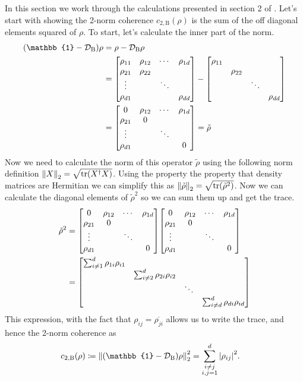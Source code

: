 \documentclass[11pt]{article}
\newcommand{\twonorm}[1][\rho]{c_{2,\mathrm{B}} (#1)}
\newcommand{\dephase}{\mathcal{D}_\mathrm{B}}
\begin{document}
In this section we work through the calculations presented in section 2 of \cite{Kendall_2020}.
Let's start with showing the 2-norm coherence $\twonorm{}$ is the sum of the off diagonal elements squared of $\rho$.
To start, let's calculate the inner part of the norm.
\begin{align*}
	\qty(\mathbb{1} - \dephase)\rho & = \rho - \dephase\rho \\
	& = \mqty[\rho_{11} & \rho_{12} & \cdots & \rho_{1d} \\ \rho_{21} & \rho_{22} & & \\ \vdots & & \ddots & \\ \rho_{d1} & & & \rho_{dd}] - \mqty[\diagonalmatrix{\rho_{11},\rho_{22},\ddots,\rho_{dd}}] \\
	& = \mqty[0 & \rho_{12} & \cdots & \rho_{1d} \\ \rho_{21} & 0 & & \\ \vdots & & \ddots & \\ \rho_{d1} & & & 0] = \tilde{\rho}
\end{align*}
Now we need to calculate the norm of this operator $\tilde{\rho}$ using the following norm definition $\norm{X}_2 = \sqrt{\tr(X^\dagger X)}$.
Using the property the property that density matrices are Hermitian we can simplify this as $\norm{\tilde{\rho}}_2 = \sqrt{\tr(\tilde{\rho}^2)}$.
Now we can calculate the diagonal elements of $\tilde{\rho}^2$ so we can sum them up and get the trace.
\begin{align*}
	\tilde{\rho}^2 & = \mqty[0 & \rho_{12} & \cdots & \rho_{1d} \\ \rho_{21} & 0 & & \\ \vdots & & \ddots & \\ \rho_{d1} & & & 0]\mqty[0 & \rho_{12} & \cdots & \rho_{1d} \\ \rho_{21} & 0 & & \\ \vdots & & \ddots & \\ \rho_{d1} & & & 0] \\
	& = \mqty[\dmat{\sum_{i \neq 1 }^d\rho_{1i}\rho_{i1},\sum_{i \neq 2}^d\rho_{2i}\rho_{i2},\ddots, \sum_{i \neq d}^d\rho_{di}\rho_{id}}]
\end{align*}
This expression, with the fact that $\rho_{ij} = \overline{\rho_{ji}}$ allows us to write the trace, and hence the 2-norm coherence as
\begin{align*}
	\twonorm{} & \coloneqq\norm{\qty(\mathbb{1} - \dephase)\rho}_2^2 = \sum_{\substack{i\neq j \\ i,j = 1}}^d\abs{\rho_{ij}}^2.
\end{align*}
\end{document}

